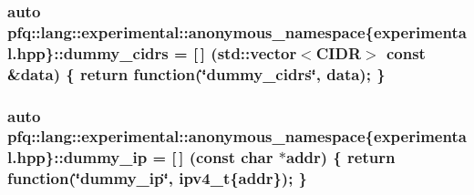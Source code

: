 \subsubsection[{\texorpdfstring{dummy\+\_\+cidrs}{dummy_cidrs}}]{\setlength{\rightskip}{0pt plus 5cm}auto pfq\+::lang\+::experimental\+::anonymous\+\_\+namespace\{experimental.\+hpp\}\+::dummy\+\_\+cidrs = \mbox{[}$\,$\mbox{]} (std\+::vector$<${\bf C\+I\+DR}$>$ const \&data) \{ return {\bf function}(\char`\"{}dummy\+\_\+cidrs\char`\"{}, data); \}}\hypertarget{namespacepfq_1_1lang_1_1experimental_1_1anonymous__namespace_02experimental_8hpp_03_ad239e0d3cd310dbf3b86ec109242aca1}{}\label{namespacepfq_1_1lang_1_1experimental_1_1anonymous__namespace_02experimental_8hpp_03_ad239e0d3cd310dbf3b86ec109242aca1}
\subsubsection[{\texorpdfstring{dummy\+\_\+ip}{dummy_ip}}]{\setlength{\rightskip}{0pt plus 5cm}auto pfq\+::lang\+::experimental\+::anonymous\+\_\+namespace\{experimental.\+hpp\}\+::dummy\+\_\+ip = \mbox{[}$\,$\mbox{]} (const char $\ast$addr) \{ return {\bf function}(\char`\"{}dummy\+\_\+ip\char`\"{}, ipv4\+\_\+t\{addr\}); \}}\hypertarget{namespacepfq_1_1lang_1_1experimental_1_1anonymous__namespace_02experimental_8hpp_03_abc66a4fd883f91bb1fd0d4d369b2499c}{}\label{namespacepfq_1_1lang_1_1experimental_1_1anonymous__namespace_02experimental_8hpp_03_abc66a4fd883f91bb1fd0d4d369b2499c}

